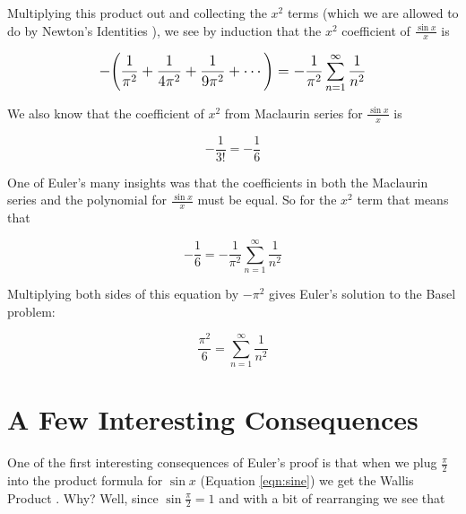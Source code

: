 \documentclass[11pt, oneside]{article}   	%
\begin{document}
\bigskip
\noindent
Multiplying this product out and collecting the $x^2$ terms
(which we are allowed to do by Newton's Identities
\cite{wiki:newton_identies}), we see by induction that the $x^2$
coefficient of $\frac{\sin x}{x}$ is

\bigskip
\bigskip
\begin{equation*}
\mathlarger{ - \bigg (\frac{1}{\pi^2} +  \frac{1}{4 \pi^2} +  \frac{1}{9 \pi^2} + \cdots \bigg ) = - \frac{1}{\pi^2} \sum\limits_{n = 1}^\infty \frac{1}{n^2}}
\end{equation*}

\bigskip
\noindent
We also know that the coefficient of $x^2$ from Maclaurin series
for $\frac{\sin x}{x}$ is  

\begin{equation*}
- \dfrac{1}{3!} = - \dfrac{1}{6}
\end{equation*}

\bigskip
\noindent
One of Euler's many insights was that the coefficients in both
the Maclaurin series and the polynomial for $\frac{\sin x}{x}$
must be equal.  So for the $x^2$ term that means that

\bigskip
\begin{equation*}
- \dfrac{1}{6} = - \frac{1}{\pi^2} \sum\limits_{n = 1}^\infty \frac{1}{n^2}
\end{equation*}

\bigskip
\noindent
Multiplying both sides of this equation by $-\pi^2$ gives Euler's
solution to the Basel problem:  

\begin{equation*}
\dfrac{\pi^2}{6} = \sum\limits_{n = 1}^\infty \frac{1}{n^2}
\end{equation*}

\section{A Few Interesting Consequences}
One of the first interesting consequences of Euler's proof is
that when we plug $\frac{\pi}{2}$ into the product formula for
$\sin x$ (Equation \ref{eqn:sine}) we get the Wallis Product
\cite{wiki:wallis}. Why? Well, since $\sin \frac{\pi}{2} = 1$ 
and with a bit of rearranging we see that
\end{document}
